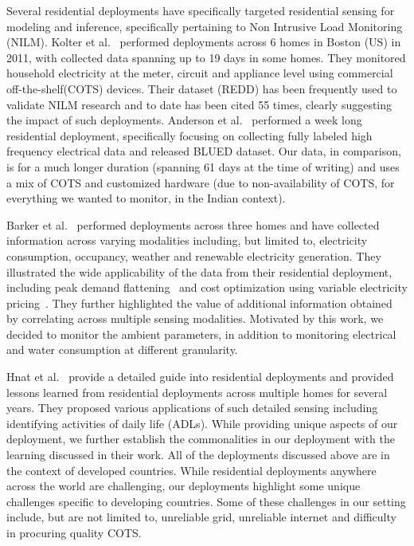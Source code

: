 \documentclass[10pt]{sensys-proc}
\begin{document}
 Several residential deployments have specifically targeted residential sensing for modeling and inference, specifically pertaining to Non Intrusive Load Monitoring (NILM). Kolter et al.~\cite{redd} performed deployments across 6 homes in Boston (US) in 2011, with collected data spanning up to 19 days in some homes. They monitored household electricity at the meter, circuit and appliance level using commercial off-the-shelf(COTS) devices. Their dataset (REDD) has been frequently used to validate NILM research and to date has been cited 55 times, clearly suggesting the impact of such deployments. Anderson et al.~\cite{blued_cmu} performed a week long residential deployment, specifically focusing on collecting fully labeled high frequency electrical data and released BLUED dataset. Our data, in comparison, is for a much longer duration (spanning 61 days at the time of writing) and uses a mix of COTS and customized hardware (due to non-availability of COTS, for everything we wanted to monitor, in the Indian context).

 Barker et al.~\cite{smart} performed deployments across three homes and have collected information across varying modalities including, but limited to, electricity consumption, occupancy, weather and renewable electricity generation. They illustrated the wide applicability of the data from their residential deployment, including peak demand flattening~\cite{smartcap} and cost optimization using variable electricity pricing~\cite{smartcharge}. They further highlighted the value of additional information obtained by correlating across multiple sensing modalities. Motivated by this work, we decided to monitor the ambient parameters, in addition to monitoring electrical and water consumption at different granularity.

Hnat et al.~\cite{hitchhiker_residential} provide a detailed guide into residential deployments and provided lessons learned from residential deployments across multiple homes for several years. They proposed various applications of such detailed sensing including identifying activities of daily life (ADLs). While providing unique aspects of our deployment, we further establish the commonalities in our deployment with the learning discussed in their work. %
All of the deployments discussed above are in the context of developed countries. While residential deployments anywhere across the world are challenging, our deployments highlight some unique challenges specific to developing countries. Some of these challenges in our setting include, but are not limited to, unreliable grid, unreliable internet and difficulty in procuring quality COTS.
\end{document}
